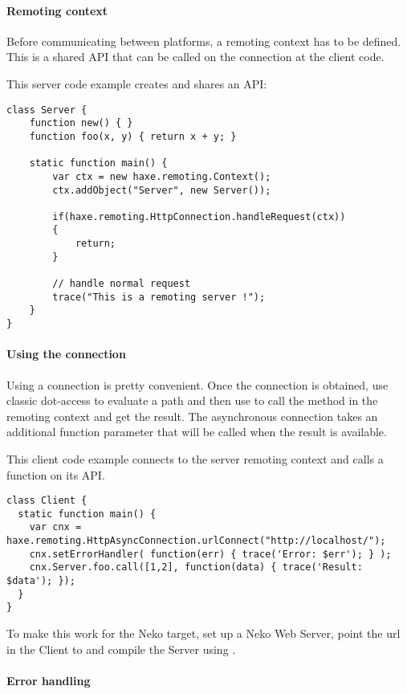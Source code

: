 \paragraph{Remoting context}

Before communicating between platforms, a remoting context has to be defined. This is a shared API that can be called on the connection at the client code.

This server code example creates and shares an API:
\begin{lstlisting}
class Server {
	function new() { }
	function foo(x, y) { return x + y; }

	static function main() {
		var ctx = new haxe.remoting.Context();
		ctx.addObject("Server", new Server());
		
		if(haxe.remoting.HttpConnection.handleRequest(ctx))
		{
			return;
		}
		
		// handle normal request
		trace("This is a remoting server !");
	} 
}
\end{lstlisting}

\paragraph{Using the connection}

Using a connection is pretty convenient. Once the connection is obtained, use classic dot-access to evaluate a path and then use  to call the method in the remoting context and get the result.
The asynchronous connection takes an additional function parameter that will be called when the result is available.

This client code example connects to the server remoting context and calls a function  on its API.
\begin{lstlisting}
class Client {
  static function main() {
    var cnx = haxe.remoting.HttpAsyncConnection.urlConnect("http://localhost/");
    cnx.setErrorHandler( function(err) { trace('Error: $err'); } );
    cnx.Server.foo.call([1,2], function(data) { trace('Result: $data'); });
  }
}
\end{lstlisting}

To make this work for the Neko target, set up a Neko Web Server, point the url in the Client to  and compile the Server using .

\paragraph{Error handling}

